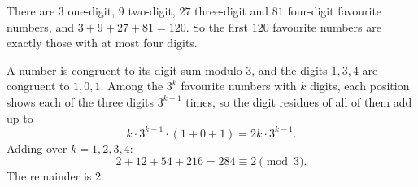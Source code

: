 There are $3$ one-digit, $9$ two-digit, $27$ three-digit and $81$ four-digit favourite numbers, and $3+9+27+81=120$. So the first $120$ favourite numbers are exactly those with at most four digits.

A number is congruent to its digit sum modulo $3$, and the digits $1,3,4$ are congruent to $1,0,1$. Among the $3^k$ favourite numbers with $k$ digits, each position shows each of the three digits $3^{k-1}$ times, so the digit residues of all of them add up to
\[k\cdot3^{k-1}\cdot(1+0+1)=2k\cdot3^{k-1}.\]
Adding over $k=1,2,3,4$:
\[2+12+54+216=284\equiv2\pmod 3 .\]
The remainder is $\boxed{2}$.
